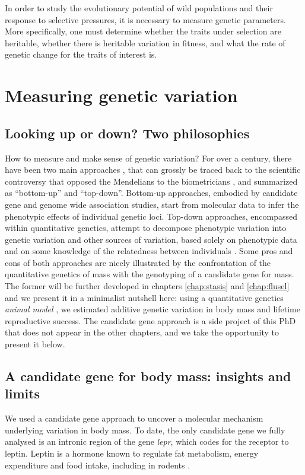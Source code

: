 In order to study the evolutionary potential of wild populations and their response to selective pressures, it is necessary to measure genetic parameters. More specifically, one must determine whether the traits under selection are heritable, whether there is heritable variation in fitness, and what the rate of genetic change for the traits of interest is. 

\section{Measuring genetic variation}
\subsection{Looking up or down? Two philosophies}
How to measure and make sense of genetic variation?
For over a century, there have been two main approaches \parencite{Liedvogel2012}, that can grossly be traced back to the scientific controversy that opposed the Mendelians to the biometricians \parencite{Dietrich2006}, and summarized as ``bottom-up'' and ``top-down''. 
Bottom-up approaches, embodied by candidate gene and genome wide association studies, start from molecular data to infer the phenotypic effects of individual genetic loci. 
Top-down approaches, encompassed within quantitative genetics, attempt to decompose phenotypic variation into genetic variation and other sources of variation, based solely on phenotypic data and on some knowledge of the relatedness between individuals \parencite{Lynch1998}. 
Some pros and cons of both approaches are nicely illustrated by the confrontation of the quantitative genetics of mass with the genotyping of a candidate gene for mass. The former will be further developed in chapters \ref{chap:stasis} and \ref{chap:flusel} and we present it in a minimalist nutshell here: using a quantitative genetics \emph{animal model} \parencite{Henderson1950, Kruuk2004}, we estimated additive genetic variation in body mass and lifetime reproductive success. The candidate gene approach is a side project of this PhD that does not appear in the other chapters, and we take the opportunity to present it below.

\subsection{A candidate gene for body mass: insights and limits}
We used a candidate gene approach \parencite{Fitzpatrick2005} to uncover a molecular mechanism underlying variation in body mass. To date, the only candidate gene we fully analysed is an intronic region of the gene \emph{lepr}, which codes for the receptor to leptin. Leptin is a hormone known to regulate fat metabolism, energy expenditure and food intake, including in rodents \parencite{Houseknecht1998}.

